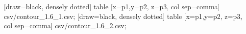  [draw=black, densely dotted] table [x=p1,y=p2, z=p3, col sep=comma] {csv/contour_1.6_1.csv}; 
  [draw=black, densely dotted] table [x=p1,y=p2, z=p3, col sep=comma] {csv/contour_1.6_2.csv}; 
